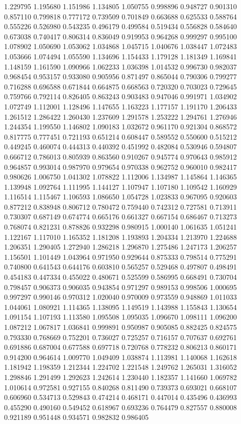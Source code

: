 1.229795
1.195680
1.151986
1.134805
1.050755
0.998896
0.948727
0.901310
0.857110
0.799818
0.777172
0.739509
0.701849
0.663688
0.625533
0.588764
0.555226
0.526980
0.543235
0.496179
0.499584
0.519434
0.556828
0.584640
0.673038
0.740417
0.806314
0.836049
0.919953
0.964268
0.999297
0.995100
1.078902
1.050690
1.053062
1.034868
1.045715
1.040676
1.038447
1.072483
1.053666
1.074494
1.055590
1.134696
1.154433
1.179128
1.181349
1.169841
1.148159
1.161590
1.090966
1.062233
1.036398
1.014532
0.996730
0.982037
0.968454
0.953157
0.933080
0.905956
0.871497
0.865044
0.790306
0.799277
0.716288
0.696588
0.671844
0.664875
0.668563
0.720320
0.703023
0.729645
0.759766
0.792114
0.826405
0.863243
0.903483
0.947046
0.991971
1.034902
1.072749
1.112001
1.128496
1.147655
1.163223
1.177157
1.191170
1.206433
1.261512
1.286422
1.260430
1.237609
1.291578
1.253222
1.294761
1.276946
1.244354
1.199550
1.146802
1.090183
1.032672
0.961170
0.921304
0.868572
0.817775
0.777451
0.721193
0.651214
0.608447
0.589552
0.550600
0.515212
0.449245
0.460074
0.444313
0.440392
0.451992
0.482084
0.530946
0.594807
0.666712
0.786013
0.805939
0.863560
0.910267
0.945774
0.970643
0.985912
0.964857
0.993014
0.987970
0.979654
0.970338
0.962752
0.960010
0.982417
0.980626
1.006750
1.041302
1.078822
1.112006
1.134987
1.145864
1.146365
1.139948
1.092764
1.111995
1.144127
1.107947
1.107180
1.109542
1.160929
1.116514
1.115467
1.106593
1.086650
1.054728
1.023833
0.967095
0.920603
0.877212
0.838948
0.806712
0.780472
0.759440
0.742312
0.727581
0.713911
0.730307
0.687149
0.674774
0.665176
0.661327
0.667154
0.686467
0.713273
0.768074
0.821231
0.878826
0.932298
0.980915
1.000140
1.061635
1.051241
1.122167
1.117010
1.165352
1.181208
1.193893
1.204334
1.213970
1.224688
1.206351
1.290405
1.272940
1.286218
1.296870
1.275486
1.247173
1.206257
1.156501
1.101449
1.043964
0.971950
0.929644
0.875333
0.798514
0.775291
0.740800
0.641543
0.644176
0.603810
0.565257
0.529468
0.497807
0.498491
0.454183
0.447334
0.455022
0.480671
0.525599
0.586995
0.668491
0.730704
0.798457
0.906373
0.906035
0.943854
0.971297
0.989153
0.998506
1.000695
0.997297
0.990146
0.970312
1.020040
0.970009
0.973559
0.948869
1.011033
1.044061
1.080921
1.114365
1.138095
1.149519
1.143988
1.155843
1.130654
1.091154
1.107193
1.113580
1.095508
1.095035
1.096670
1.098111
1.096200
1.087212
1.067817
1.036841
0.999891
0.950987
0.905085
0.882425
0.824575
0.793330
0.768669
0.752201
0.736027
0.725257
0.716157
0.707637
0.692761
0.691886
0.687004
0.677588
0.697718
0.720768
0.778232
0.806213
0.860171
0.914200
0.964614
1.009770
1.049409
1.038874
1.113981
1.140068
1.162618
1.181942
1.198359
1.212344
1.224702
1.221548
1.249762
1.265031
1.316052
1.298846
1.291499
1.292623
1.242614
1.230440
1.182357
1.141660
1.069782
1.010614
0.972581
0.927155
0.840268
0.811490
0.739373
0.693021
0.668107
0.606960
0.534713
0.529843
0.474214
0.468171
0.447014
0.435496
0.436993
0.455290
0.490160
0.549452
0.618967
0.693236
0.764479
0.827557
0.880008
0.921189
0.951448
0.934571
0.982832
0.986405

